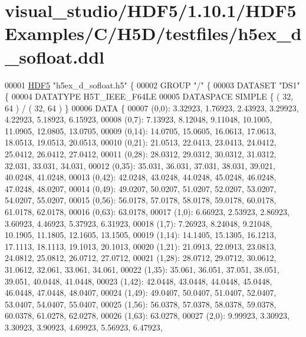 \hypertarget{visual__studio_2_h_d_f5_21_810_81_2_h_d_f5_examples_2_c_2_h5_d_2testfiles_2h5ex__d__sofloat_8ddl_source}{}\section{visual\+\_\+studio/\+H\+D\+F5/1.10.1/\+H\+D\+F5\+Examples/\+C/\+H5\+D/testfiles/h5ex\+\_\+d\+\_\+sofloat.ddl}
\label{visual__studio_2_h_d_f5_21_810_81_2_h_d_f5_examples_2_c_2_h5_d_2testfiles_2h5ex__d__sofloat_8ddl_source}

\begin{DoxyCode}
00001 \hyperlink{namespace_h_d_f5}{HDF5} \textcolor{stringliteral}{"h5ex\_d\_sofloat.h5"} \{
00002 GROUP \textcolor{stringliteral}{"/"} \{
00003    DATASET \textcolor{stringliteral}{"DS1"} \{
00004       DATATYPE  H5T\_IEEE\_F64LE
00005       DATASPACE  SIMPLE \{ ( 32, 64 ) / ( 32, 64 ) \}
00006       DATA \{
00007       (0,0): 3.32923, 1.76923, 2.43923, 3.29923, 4.22923, 5.18923, 6.15923,
00008       (0,7): 7.13923, 8.12048, 9.11048, 10.1005, 11.0905, 12.0805, 13.0705,
00009       (0,14): 14.0705, 15.0605, 16.0613, 17.0613, 18.0513, 19.0513, 20.0513,
00010       (0,21): 21.0513, 22.0413, 23.0413, 24.0412, 25.0412, 26.0412, 27.0412,
00011       (0,28): 28.0312, 29.0312, 30.0312, 31.0312, 32.031, 33.031, 34.031,
00012       (0,35): 35.031, 36.031, 37.031, 38.031, 39.021, 40.0248, 41.0248,
00013       (0,42): 42.0248, 43.0248, 44.0248, 45.0248, 46.0248, 47.0248, 48.0207,
00014       (0,49): 49.0207, 50.0207, 51.0207, 52.0207, 53.0207, 54.0207, 55.0207,
00015       (0,56): 56.0178, 57.0178, 58.0178, 59.0178, 60.0178, 61.0178, 62.0178,
00016       (0,63): 63.0178,
00017       (1,0): 6.66923, 2.53923, 2.86923, 3.60923, 4.46923, 5.37923, 6.31923,
00018       (1,7): 7.26923, 8.24048, 9.21048, 10.1905, 11.1805, 12.1605, 13.1505,
00019       (1,14): 14.1405, 15.1305, 16.1213, 17.1113, 18.1113, 19.1013, 20.1013,
00020       (1,21): 21.0913, 22.0913, 23.0813, 24.0812, 25.0812, 26.0712, 27.0712,
00021       (1,28): 28.0712, 29.0712, 30.0612, 31.0612, 32.061, 33.061, 34.061,
00022       (1,35): 35.061, 36.051, 37.051, 38.051, 39.051, 40.0448, 41.0448,
00023       (1,42): 42.0448, 43.0448, 44.0448, 45.0448, 46.0448, 47.0448, 48.0407,
00024       (1,49): 49.0407, 50.0407, 51.0407, 52.0407, 53.0407, 54.0407, 55.0407,
00025       (1,56): 56.0378, 57.0378, 58.0378, 59.0378, 60.0378, 61.0278, 62.0278,
00026       (1,63): 63.0278,
00027       (2,0): 9.99923, 3.30923, 3.30923, 3.90923, 4.69923, 5.56923, 6.47923,

\end{DoxyCode}
